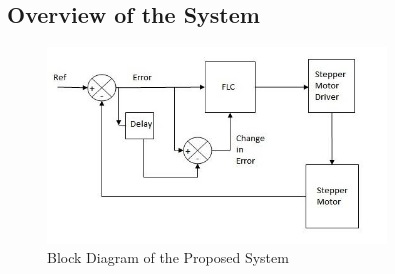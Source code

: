 \documentclass[paper=a4, fontsize=11pt]{scrartcl}
\numberwithin{equation}{section}		%
\numberwithin{figure}{section}			%
\numberwithin{table}{section}				%
\begin{document}
\subsection{Overview of the System}
\begin{figure}[ht!]
\centering
\includegraphics[width=90mm]{system_overview_stepper.jpg}
\caption{Block Diagram of the Proposed System \label{overflow}}
\end{figure}
\end{document}
